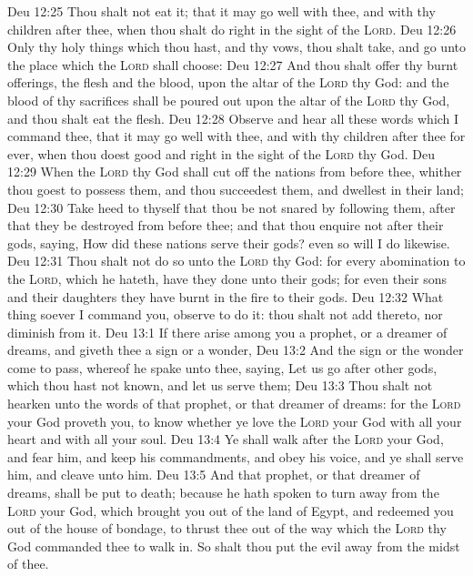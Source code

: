\vs Deu 12:25 Thou shalt not eat it; that it may go well with thee, and with thy children after thee, when thou shalt do  right in the sight of the \textsc{Lord}.
\vs Deu 12:26 Only thy holy things which thou hast, and thy vows, thou shalt take, and go unto the place which the \textsc{Lord} shall choose:
\vs Deu 12:27 And thou shalt offer thy burnt offerings, the flesh and the blood, upon the altar of the \textsc{Lord} thy God: and the blood of thy sacrifices shall be poured out upon the altar of the \textsc{Lord} thy God, and thou shalt eat the flesh.
\vs Deu 12:28 Observe and hear all these words which I command thee, that it may go well with thee, and with thy children after thee for ever, when thou doest  good and right in the sight of the \textsc{Lord} thy God.
\vs Deu 12:29 When the \textsc{Lord} thy God shall cut off the nations from before thee, whither thou goest to possess them, and thou succeedest them, and dwellest in their land;
\vs Deu 12:30 Take heed to thyself that thou be not snared by following them, after that they be destroyed from before thee; and that thou enquire not after their gods, saying, How did these nations serve their gods? even so will I do likewise.
\vs Deu 12:31 Thou shalt not do so unto the \textsc{Lord} thy God: for every abomination to the \textsc{Lord}, which he hateth, have they done unto their gods; for even their sons and their daughters they have burnt in the fire to their gods.
\vs Deu 12:32 What thing soever I command you, observe to do it: thou shalt not add thereto, nor diminish from it.
\vs Deu 13:1 If there arise among you a prophet, or a dreamer of dreams, and giveth thee a sign or a wonder,
\vs Deu 13:2 And the sign or the wonder come to pass, whereof he spake unto thee, saying, Let us go after other gods, which thou hast not known, and let us serve them;
\vs Deu 13:3 Thou shalt not hearken unto the words of that prophet, or that dreamer of dreams: for the \textsc{Lord} your God proveth you, to know whether ye love the \textsc{Lord} your God with all your heart and with all your soul.
\vs Deu 13:4 Ye shall walk after the \textsc{Lord} your God, and fear him, and keep his commandments, and obey his voice, and ye shall serve him, and cleave unto him.
\vs Deu 13:5 And that prophet, or that dreamer of dreams, shall be put to death; because he hath spoken to turn  away from the \textsc{Lord} your God, which brought you out of the land of Egypt, and redeemed you out of the house of bondage, to thrust thee out of the way which the \textsc{Lord} thy God commanded thee to walk in. So shalt thou put the evil away from the midst of thee.
